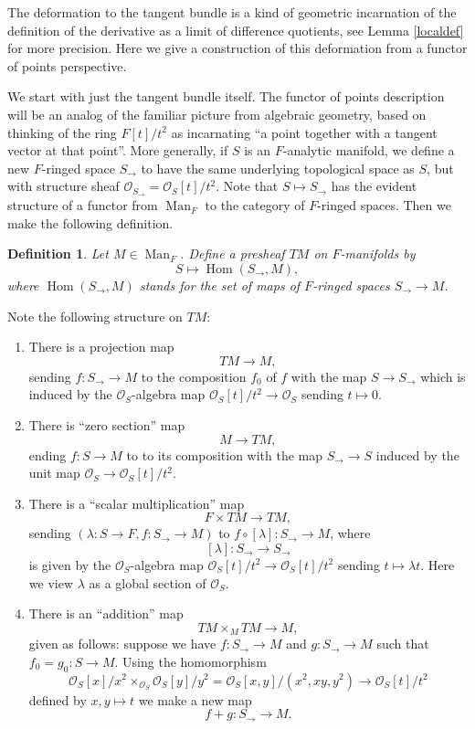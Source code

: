 \documentclass[12pt]{article}
\newtheorem{definition}[theorem]{Definition}
\newcommand{\mc}{\mathcal}
\begin{document}
The deformation to the tangent bundle is a kind of geometric incarnation of the definition of the derivative as a limit of difference quotients, see Lemma \ref{localdef} for more precision.  Here we give a construction of this deformation from a functor of points perspective.

We start with just the tangent bundle itself.  The functor of points description will be an analog of the familiar picture from algebraic geometry, based on thinking of the ring $F[t]/t^2$ as incarnating ``a point together with a tangent vector at that point''.  More generally, if $S$ is an $F$-analytic manifold, we define a new $F$-ringed space $S_\rightarrow$ to have the same underlying topological space as $S$, but with structure sheaf $\mathcal{O}_{S_\rightarrow} = \mathcal{O}_S[t]/t^2$.  Note that $S\mapsto S_\rightarrow$ has the evident structure of a functor from $\operatorname{Man}_F$ to the category of $F$-ringed spaces.  Then we make the following definition.

\begin{definition}
Let $M\in\operatorname{Man}_F$.  Define a presheaf $TM$ on $F$-manifolds by
$$S\mapsto \operatorname{Hom}(S_\rightarrow,M),$$
where $\operatorname{Hom}(S_\rightarrow,M)$ stands for the set of maps of $F$-ringed spaces $S_\rightarrow\rightarrow M$.
\end{definition}

Note the following structure on $TM$:

\begin{enumerate}
\item There is a projection map
$$TM\rightarrow M,$$
sending $f:S_\rightarrow \rightarrow M$ to the composition $f_0$ of $f$ with the map $S\rightarrow S_\rightarrow$ which is induced by the $\mathcal{O}_S$-algebra map $\mathcal{O}_S[t]/t^2\rightarrow \mathcal{O}_S$ sending $t\mapsto 0$.
\item There is ``zero section'' map
$$M\rightarrow TM,$$
ending $f:S\rightarrow M$ to to its composition with the map $S_\rightarrow\rightarrow S$ induced by the unit map $\mathcal{O}_S\rightarrow\mathcal{O}_S[t]/t^2$.
\item There is a ``scalar multiplication'' map
$$F\times TM\rightarrow TM,$$
sending $(\lambda:S\rightarrow F, f:S_\rightarrow\rightarrow M)$ to $f\circ [\lambda]:S_\rightarrow \rightarrow M$, where
$$[\lambda]:S_{\rightarrow}\rightarrow S_{\rightarrow}$$
is given by the $\mathcal{O}_S$-algebra map $\mathcal{O}_S[t]/t^2\rightarrow \mathcal{O}_S[t]/t^2$ sending $t\mapsto \lambda t$.  Here we view $\lambda$ as a global section of $\mathcal{O}_S$.
\item There is an ``addition'' map
$$TM\times_M TM\rightarrow M,$$
given as follows: suppose we have $f:S_\rightarrow\rightarrow M$ and $g:S_\rightarrow\rightarrow M$ such that $f_0=g_0:S\rightarrow M$.  Using the homomorphism
$$\mathcal{O}_S[x]/x^2\times_{\mathcal{O}_S}\mathcal{O}_S[y]/y^2=\mc{O}_S[x,y]/(x^2,xy,y^2)\to \mathcal{O}_S[t]/t^2$$
defined by $x,y\mapsto t$ we make a new map
$$f+g:S_\to\rightarrow M.$$
\end{enumerate}
\end{document}
